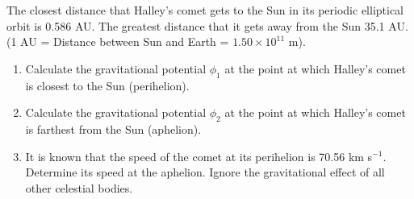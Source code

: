 \documentclass[a4paper,12pt]{article}
\begin{document}
\begin{enumerate}
The closest distance that Halley’s comet gets to the Sun in its periodic elliptical orbit is 0.586 AU. The greatest distance that it gets away from the Sun 35.1 AU.\\ (1 AU = Distance between Sun and Earth = $1.50 × 10^{11}$ m). 


\begin{enumerate}
\item Calculate the gravitational potential $\phi_1$  at the point at which Halley’s comet is closest to the Sun (perihelion).
\item Calculate the gravitational potential $\phi_2$ at the point at which Halley’s comet is farthest from the Sun (aphelion).
\item It is known that the speed of the comet at its perihelion is 70.56 km s$^{-1}$. Determine its speed at the aphelion. Ignore the gravitational effect of all other celestial bodies. 
\end{enumerate}
\end{enumerate}
\end{document}
